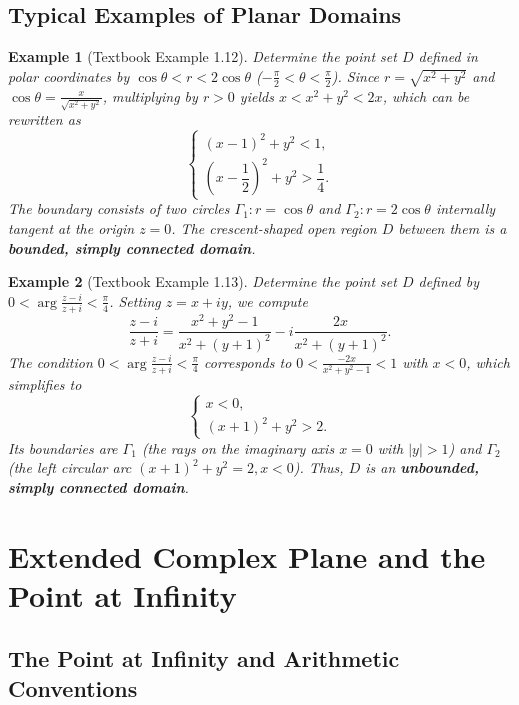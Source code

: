 \documentclass[11pt,a4paper]{article}
\theoremstyle{definitionbreak}
\theoremstyle{examplebreak}
\newtheorem{example}{Example}
\theoremstyle{plain}
\begin{document}
\subsection{Typical Examples of Planar Domains}

\begin{example}[Textbook Example 1.12]
Determine the point set $D$ defined in polar coordinates by $\cos\theta < r < 2\cos\theta$ ($-\frac{\pi}{2} < \theta < \frac{\pi}{2}$). Since $r = \sqrt{x^2+y^2}$ and $\cos\theta = \frac{x}{\sqrt{x^2+y^2}}$, multiplying by $r > 0$ yields $x < x^2 + y^2 < 2x$, which can be rewritten as
\[
    \begin{cases}
        (x - 1)^2 + y^2 < 1, \\[4pt]
        \left(x - \dfrac{1}{2}\right)^2 + y^2 > \dfrac{1}{4}.
    \end{cases}
\]
The boundary consists of two circles $\Gamma_1: r = \cos\theta$ and $\Gamma_2: r = 2\cos\theta$ internally tangent at the origin $z = 0$. The crescent-shaped open region $D$ between them is a \textbf{bounded, simply connected domain}.
\end{example}

\begin{example}[Textbook Example 1.13]
Determine the point set $D$ defined by $0 < \arg\frac{z - i}{z + i} < \frac{\pi}{4}$. Setting $z = x + iy$, we compute
\[
    \frac{z - i}{z + i} = \frac{x^2 + y^2 - 1}{x^2 + (y+1)^2} - i \frac{2x}{x^2 + (y+1)^2}.
\]
The condition $0 < \arg\frac{z - i}{z + i} < \frac{\pi}{4}$ corresponds to $0 < \frac{-2x}{x^2 + y^2 - 1} < 1$ with $x < 0$, which simplifies to
\[
    \begin{cases}
        x < 0, \\[4pt]
        (x + 1)^2 + y^2 > 2.
    \end{cases}
\]
Its boundaries are $\Gamma_1$ (the rays on the imaginary axis $x = 0$ with $|y| > 1$) and $\Gamma_2$ (the left circular arc $(x+1)^2 + y^2 = 2, x < 0$). Thus, $D$ is an \textbf{unbounded, simply connected domain}.
\end{example}

\section{Extended Complex Plane and the Point at Infinity}

\subsection{The Point at Infinity and Arithmetic Conventions}
\end{document}
